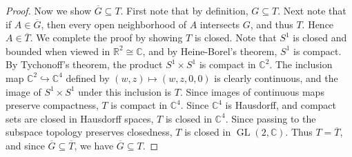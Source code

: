 \documentclass[11pt, letterpaper]{article}
\theoremstyle{plain}
\begin{document}
\begin{proof}
	Now we show $\overline{G} \subseteq T$. First note that by definition, $G\subseteq T$. Next note that if $A\in \overline{G} $, then every open neighborhood of $A$ intersects $G$, and thus $T$. Hence $A\in \overline{T} $. We complete the proof by showing $T$ is closed. Note that $S^1$ is closed and bounded when viewed in $\mathbb{R} ^2 \cong \mathbb{C} $, and by Heine-Borel's theorem, $S^1$ is compact. By Tychonoff's theorem, the product $S^1\times S^1$ is compact in $\mathbb{C} ^2$. The inclusion map $\mathbb{C} ^2\hookrightarrow \mathbb{C} ^4$ defined by $(w,z)\mapsto (w,z,0,0)$ is clearly continuous, and the image of $S^1\times S^1$ under this inclusion is $T$. Since images of continuous maps preserve compactness, $T$ is compact in $\mathbb{C} ^4$. Since $\mathbb{C} ^4$ is Hausdorff, and compact sets are closed in Hausdorff spaces, $T$ is closed in $\mathbb{C} ^4$. Since passing to the subspace topology preserves closedness, $T$ is closed in $\operatorname{GL} (2,\mathbb{C} )$. Thus $T=\overline{T} $, and since $\overline{G} \subseteq \overline{T} $, we have $\overline{G} \subseteq T$.
\end{proof}
\end{document}
